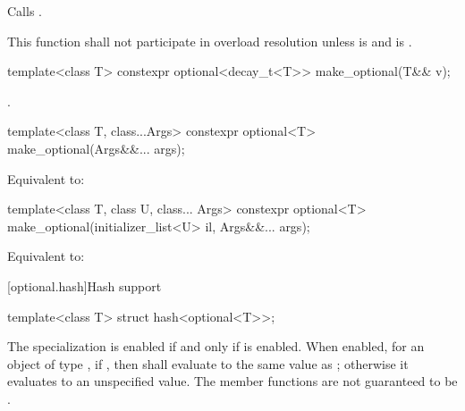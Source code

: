 \begin{itemdescr}
\pnum
\effects
Calls .

\pnum
\remarks This function shall not participate in overload resolution
unless  is  and
 is .
\end{itemdescr}

%
\begin{itemdecl}
template<class T> constexpr optional<decay_t<T>> make_optional(T&& v);
\end{itemdecl}

\begin{itemdescr}
\pnum
\returns
{}.
\end{itemdescr}

%
\begin{itemdecl}
template<class T, class...Args>
  constexpr optional<T> make_optional(Args&&... args);
\end{itemdecl}

\begin{itemdescr}
\pnum
\effects Equivalent to: 
\end{itemdescr}

%
\begin{itemdecl}
template<class T, class U, class... Args>
  constexpr optional<T> make_optional(initializer_list<U> il, Args&&... args);
\end{itemdecl}

\begin{itemdescr}
\pnum
\effects Equivalent to: 
\end{itemdescr}

[optional.hash]{Hash support}

%
\begin{itemdecl}
template<class T> struct hash<optional<T>>;
\end{itemdecl}

\begin{itemdescr}
\pnum
The specialization  is enabled
if and only if  is enabled.
When enabled, for an object  of type ,
if , then 
shall evaluate to the same value as ;
otherwise it evaluates to an unspecified value.
The member functions are not guaranteed to be .
\end{itemdescr}


